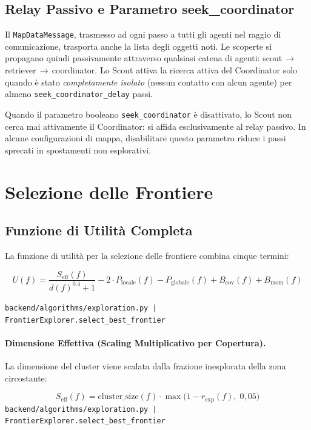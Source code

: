 \subsection{Relay Passivo e Parametro seek\_coordinator}

Il \texttt{MapDataMessage}, trasmesso ad ogni passo a tutti gli agenti nel raggio di
comunicazione, trasporta anche la lista degli oggetti noti. Le scoperte si propagano
quindi passivamente attraverso qualsiasi catena di agenti:
scout\,$\rightarrow$\,retriever\,$\rightarrow$\,coordinator. Lo Scout attiva la ricerca
attiva del Coordinator solo quando \`e stato \textit{completamente isolato} (nessun contatto
con alcun agente) per almeno \texttt{seek\_coordinator\_delay} passi.

Quando il parametro booleano \texttt{seek\_coordinator} \`e disattivato, lo Scout non
cerca mai attivamente il Coordinator: si affida esclusivamente al relay passivo.
In alcune configurazioni di mappa, disabilitare questo parametro riduce i passi
sprecati in spostamenti non esplorativi.

\section{Selezione delle Frontiere}

\subsection{Funzione di Utilit\`a Completa}

La funzione di utilit\`a per la selezione delle frontiere combina cinque termini:

$$U(f) = \frac{S_{\text{eff}}(f)}{d(f)^{0.4} + 1}
       - 2 \cdot P_{\text{locale}}(f)
       - P_{\text{globale}}(f)
       + B_{\text{cov}}(f)
       + B_{\text{mom}}(f)$$

\noindent\hfill{\footnotesize\texttt{backend/algorithms/exploration.py | FrontierExplorer.select\_best\_frontier}}

\paragraph{Dimensione Effettiva (Scaling Multiplicativo per Copertura).}
La dimensione del cluster viene scalata dalla frazione inesplorata della zona circostante:

$$S_{\text{eff}}(f) = \text{cluster\_size}(f) \cdot \max\!\big(1 - r_{\text{exp}}(f),\; 0{,}05\big)$$
\noindent\hfill{\footnotesize\texttt{backend/algorithms/exploration.py | FrontierExplorer.select\_best\_frontier}}

